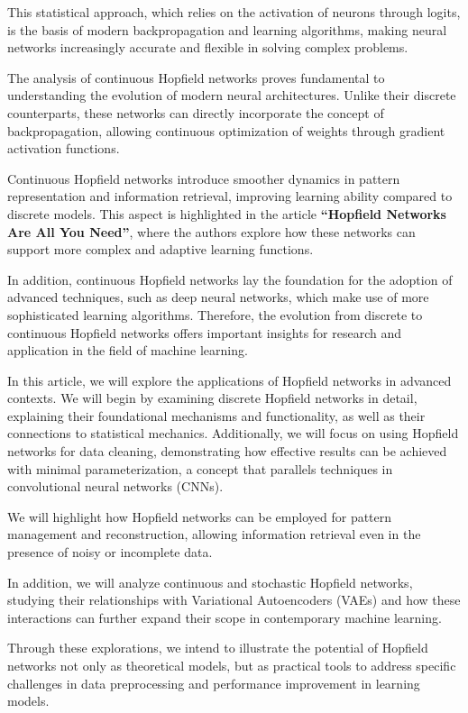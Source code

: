 \noindent This statistical approach, which relies on the activation of neurons through logits, is the basis of modern backpropagation and learning algorithms, making neural networks increasingly accurate and flexible in solving complex problems.

\bigskip\noindent The analysis of continuous Hopfield networks proves fundamental to understanding the evolution of modern neural architectures. Unlike their discrete counterparts, these networks can directly incorporate the concept of backpropagation, allowing continuous optimization of weights through gradient activation functions.

\noindent Continuous Hopfield networks introduce smoother dynamics in pattern representation and information retrieval, improving learning ability compared to discrete models. This aspect is highlighted in the article \textbf{“Hopfield Networks Are All You Need”}, where the authors explore how these networks can support more complex and adaptive learning functions.

\noindent In addition, continuous Hopfield networks lay the foundation for the adoption of advanced techniques, such as deep neural networks, which make use of more sophisticated learning algorithms. Therefore, the evolution from discrete to continuous Hopfield networks offers important insights for research and application in the field of machine learning.

\bigskip\noindent In this article, we will explore the applications of Hopfield networks in advanced contexts. We will begin by examining discrete Hopfield networks in detail, explaining their foundational mechanisms and functionality, as well as their connections to statistical mechanics. Additionally, we will focus on using Hopfield networks for data cleaning, demonstrating how effective results can be achieved with minimal parameterization, a concept that parallels techniques in convolutional neural networks (CNNs).

\noindent We will highlight how Hopfield networks can be employed for pattern management and reconstruction, allowing information retrieval even in the presence of noisy or incomplete data.

\noindent In addition, we will analyze continuous and stochastic Hopfield networks, studying their relationships with Variational Autoencoders (VAEs) and how these interactions can further expand their scope in contemporary machine learning.

\noindent Through these explorations, we intend to illustrate the potential of Hopfield networks not only as theoretical models, but as practical tools to address specific challenges in data preprocessing and performance improvement in learning models.
